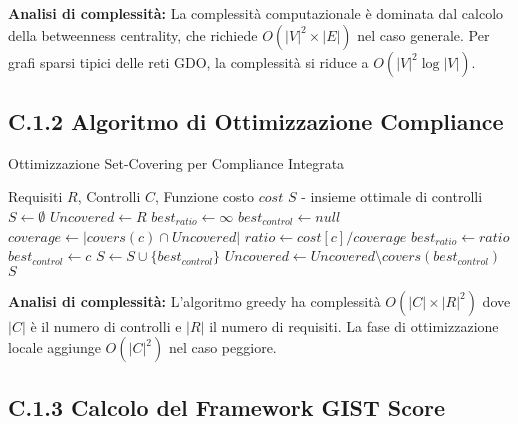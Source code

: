 \textbf{Analisi di complessità:} La complessità computazionale è dominata dal calcolo della betweenness centrality, che richiede $O(|V|^2 \times |E|)$ nel caso generale. Per grafi sparsi tipici delle reti GDO, la complessità si riduce a $O(|V|^2 \log |V|)$.

\subsection{C.1.2 Algoritmo di Ottimizzazione Compliance}

\begin{algorithm}
\caption{Ottimizzazione Set-Covering per Compliance Integrata}
\label{alg:compliance}
\begin{algorithmic}
\Require Requisiti $R$, Controlli $C$, Funzione costo $cost$
\Ensure $S$ - insieme ottimale di controlli
\State $S \gets \emptyset$
\State $Uncovered \gets R$
    \State $best_{ratio} \gets \infty$
    \State $best_{control} \gets null$
        \State $coverage \gets |covers(c) \cap Uncovered|$
            \State $ratio \gets cost[c] / coverage$
                \State $best_{ratio} \gets ratio$
                \State $best_{control} \gets c$
            \EndIf
        \EndIf
    \EndFor
    \State $S \gets S \cup \{best_{control}\}$
    \State $Uncovered \gets Uncovered \setminus covers(best_{control})$
\EndWhile
\State \Return $S$
\end{algorithmic}
\end{algorithm}

\textbf{Analisi di complessità:} L'algoritmo greedy ha complessità $O(|C| \times |R|^2)$ dove $|C|$ è il numero di controlli e $|R|$ il numero di requisiti. La fase di ottimizzazione locale aggiunge $O(|C|^2)$ nel caso peggiore.

\subsection{C.1.3 Calcolo del Framework GIST Score}

